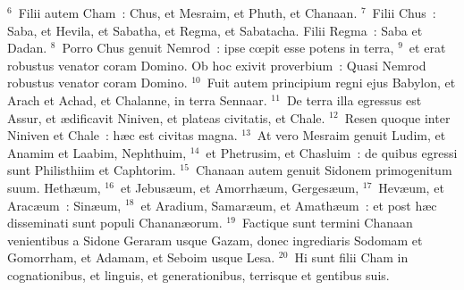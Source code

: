 ${}^{6}$~Filii autem Cham~: Chus, et Mesraim, et Phuth, et Chanaan.
${}^{7}$~Filii Chus~: Saba, et Hevila, et Sabatha, et Regma, et Sabatacha. Filii Regma~: Saba et Dadan.
${}^{8}$~Porro Chus genuit Nemrod~: ipse cœpit esse potens in terra,
${}^{9}$~et erat robustus venator coram Domino. Ob hoc exivit proverbium~: Quasi Nemrod robustus venator coram Domino.
${}^{10}$~Fuit autem principium regni ejus Babylon, et Arach et Achad, et Chalanne, in terra Sennaar.
${}^{11}$~De terra illa egressus est Assur, et \ae dificavit Niniven, et plateas civitatis, et Chale.
${}^{12}$~Resen quoque inter Niniven et Chale~: h\ae c est civitas magna.
${}^{13}$~At vero Mesraim genuit Ludim, et Anamim et Laabim, Nephthuim,
${}^{14}$~et Phetrusim, et Chasluim~: de quibus egressi sunt Philisthiim et Caphtorim.
${}^{15}$~Chanaan autem genuit Sidonem primogenitum suum. Heth\ae um,
${}^{16}$~et Jebus\ae um, et Amorrh\ae um, Gerges\ae um,
${}^{17}$~Hev\ae um, et Arac\ae um~: Sin\ae um,
${}^{18}$~et Aradium, Samar\ae um, et Amath\ae um~: et post h\ae c disseminati sunt populi Chanan\ae orum.
${}^{19}$~Factique sunt termini Chanaan venientibus a Sidone Geraram usque Gazam, donec ingrediaris Sodomam et Gomorrham, et Adamam, et Seboim usque Lesa.
${}^{20}$~Hi sunt filii Cham in cognationibus, et linguis, et generationibus, terrisque et gentibus suis.


